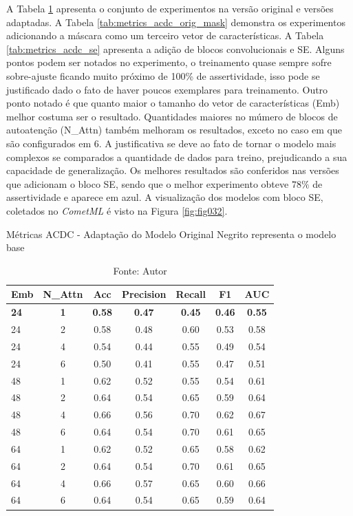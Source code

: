 A Tabela \ref{tab:metrics_acdc_orig} apresenta o conjunto de experimentos na versão original e versões adaptadas. A Tabela \ref{tab:metrics_acdc_orig_mask} demonstra os experimentos adicionando a máscara como um terceiro vetor de características. A Tabela \ref{tab:metrics_acdc_se} apresenta a adição de blocos convolucionais e  \gls{SE}. Alguns pontos podem ser notados no experimento, o treinamento quase sempre sofre sobre-ajuste ficando muito próximo de 100\% de assertividade, isso pode se justificado dado o fato de haver poucos exemplares para treinamento. Outro ponto notado é que quanto maior o tamanho do vetor de características (Emb) melhor costuma ser o resultado. Quantidades maiores no múmero de blocos de autoatenção (N\_Attn) também melhoram os resultados, exceto no caso em que são configurados em $6$. A justificativa se deve ao fato de tornar o modelo mais complexos se comparados a quantidade de dados para treino, prejudicando a sua capacidade de generalização. Os melhores resultados são conferidos nas versões que adicionam o bloco \gls{SE}, sendo que o melhor experimento obteve $78\%$ de assertividade e aparece em azul. A visualização dos modelos com bloco \gls{SE}, coletados no \textit{CometML} é visto na Figura \ref{fig:fig032}.


\begin{table}[htbp]
\centering
\caption{Métricas ACDC - Adaptação do Modelo Original
\newline Negrito representa o modelo base}
\begin{tabular}{lcccccc}
\toprule
\textbf{Emb} & \textbf{N\_Attn} & \textbf{Acc} & \textbf{Precision} & \textbf{Recall} & \textbf{F1} & \textbf{AUC} \\
\midrule
\textbf{24} & \textbf{1} & \textbf{0.58} & \textbf{0.47} & \textbf{0.45} & \textbf{0.46} & \textbf{0.55} \\
24 & 2 & 0.58 & 0.48 & 0.60 & 0.53 & 0.58 \\
24 & 4 & 0.54 & 0.44 & 0.55 & 0.49 & 0.54 \\
24 & 6 & 0.50 & 0.41 & 0.55 & 0.47 & 0.51 \\
\hline
48 & 1 & 0.62 & 0.52 & 0.55 & 0.54 & 0.61 \\
48 & 2 & 0.64 & 0.54 & 0.65 & 0.59 & 0.64 \\
48 & 4 & 0.66 & 0.56 & 0.70 & 0.62 & 0.67 \\
48 & 6 & 0.64 & 0.54 & 0.70 & 0.61 & 0.65 \\
\hline
64 & 1 & 0.62 & 0.52 & 0.65 & 0.58 & 0.62 \\
64 & 2 & 0.64 & 0.54 & 0.70 & 0.61 & 0.65 \\
64 & 4 & 0.66 & 0.57 & 0.65 & 0.60 & 0.66 \\
64 & 6 & 0.64 & 0.54 & 0.65 & 0.59 & 0.64 \\
\bottomrule
\end{tabular}
\caption*{Fonte: Autor}
\label{tab:metrics_acdc_orig}
\end{table}


